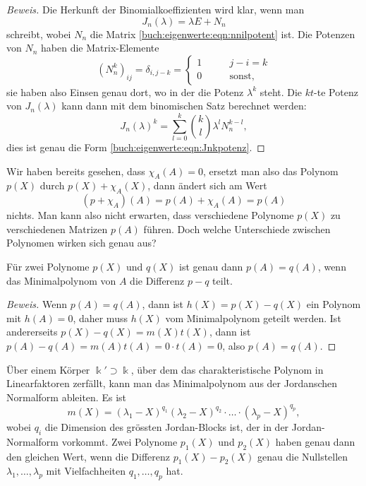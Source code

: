 \begin{proof}[Beweis]
Die Herkunft der Binomialkoeffizienten wird klar, wenn man
\[
J_n(\lambda) = \lambda E + N_n
\]
schreibt, wobei $N_n$ die Matrix \eqref{buch:eigenwerte:eqn:nnilpotent} ist.
Die Potenzen von $N_n$ haben die Matrix-Elemente
\[
(N_n^k)_{ij}
=
\delta_{i,j-k}
=
\begin{cases}
1&\qquad j-i=k\\
0&\qquad\text{sonst,}
\end{cases}
\]
sie haben also Einsen genau dort, wo in der
\label{buch:eigenwerte:eqn:Jnkpotenz} die Potenz $\lambda^{k}$ steht.
Die $kt$-te Potenz von $J_n(\lambda)$ kann dann mit dem binomischen
Satz berechnet werden:
\[
J_n(\lambda)^k
=
\sum_{l=0}^k \binom{k}{l}\lambda^l N_n^{k-l},
\]
dies ist genau die Form \eqref{buch:eigenwerte:eqn:Jnkpotenz}.
\end{proof}

Wir haben bereits gesehen, dass $\chi_A(A)=0$, ersetzt man also das
Polynom $p(X)$ durch $p(X)+\chi_A(X)$, dann ändert sich am Wert 
\[
(p+\chi_A)(A)
=
p(A) + \chi_A(A)
=
p(A)
\]
nichts.
Man kann also nicht erwarten, dass verschiedene Polynome 
$p(X)$ zu verschiedenen Matrizen $p(A)$ führen.
Doch welche Unterschiede zwischen Polynomen wirken sich genau aus?

\begin{satz}
Für zwei Polynome $p(X)$ und $q(X)$ ist genau dann $p(A)=q(A)$, wenn
das Minimalpolynom von $A$ die Differenz $p-q$ teilt.
\end{satz}

\begin{proof}[Beweis]
Wenn $p(A)=q(A)$, dann ist $h(X)=p(X)-q(X)$ ein Polynom mit $h(A)=0$,
daher muss $h(X)$ vom Minimalpolynom geteilt werden.
Ist andererseits $p(X)-q(X)=m(X)t(X)$, dann ist
$p(A)-q(A)=m(A)t(A)=0\cdot t(A) = 0$, also $p(A)=q(A)$.
\end{proof}

Über einem Körper $\Bbbk'\supset\Bbbk$, über dem das charakteristische
Polynom in Linearfaktoren zerfällt, kann man das Minimalpolynom aus
der Jordanschen Normalform ableiten.
Es ist
\[
m(X)
=
(\lambda_1-X)^{q_1}
(\lambda_2-X)^{q_2}
\cdot\ldots
\cdot
(\lambda_p-X)^{q_p},
\]
wobei $q_i$ die Dimension des grössten Jordan-Blocks ist, der in der
Jordan-Normalform vorkommt.
Zwei Polynome $p_1(X)$ und $p_2(X)$ haben genau dann den gleichen Wert,
wenn die Differenz $p_1(X)-p_2(X)$ genau die Nullstellen
$\lambda_1,\dots,\lambda_p$ mit Vielfachheiten $q_1,\dots,q_p$ hat.

